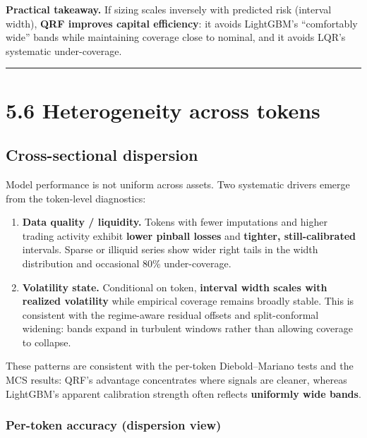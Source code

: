 \documentclass[
  a4paper,
  DIV=11,
  numbers=noendperiod]{scrreprt}
\providecommand{\tightlist}{%
  \setlength{\itemsep}{0pt}\setlength{\parskip}{0pt}}
\begin{document}
\textbf{Practical takeaway.} If sizing scales inversely with predicted
risk (interval width), \textbf{QRF improves capital efficiency}: it
avoids LightGBM's ``comfortably wide'' bands while maintaining coverage
close to nominal, and it avoids LQR's systematic under-coverage.

\begin{center}\rule{0.5\linewidth}{0.5pt}\end{center}

\section{5.6 Heterogeneity across
tokens}\label{heterogeneity-across-tokens}

\subsection{Cross-sectional
dispersion}\label{cross-sectional-dispersion}

Model performance is not uniform across assets. Two systematic drivers
emerge from the token-level diagnostics:

\begin{enumerate}
\def\labelenumi{\arabic{enumi}.}
\tightlist
\item
  \textbf{Data quality / liquidity.} Tokens with fewer imputations and
  higher trading activity exhibit \textbf{lower pinball losses} and
  \textbf{tighter, still-calibrated} intervals. Sparse or illiquid
  series show wider right tails in the width distribution and occasional
  80\% under-coverage.
\item
  \textbf{Volatility state.} Conditional on token, \textbf{interval
  width scales with realized volatility} while empirical coverage
  remains broadly stable. This is consistent with the regime-aware
  residual offsets and split-conformal widening: bands expand in
  turbulent windows rather than allowing coverage to collapse.
\end{enumerate}

These patterns are consistent with the per-token Diebold--Mariano tests
and the MCS results: QRF's advantage concentrates where signals are
cleaner, whereas LightGBM's apparent calibration strength often reflects
\textbf{uniformly wide bands}.

\subsubsection{Per-token accuracy (dispersion
view)}\label{per-token-accuracy-dispersion-view}
\end{document}
